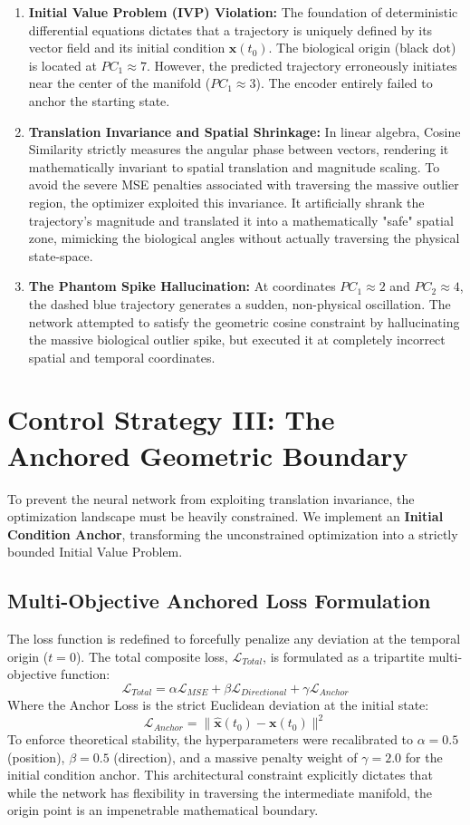 \documentclass[12pt, a4paper]{article}
\begin{document}
	\begin{enumerate}
		\item \textbf{Initial Value Problem (IVP) Violation:} The foundation of deterministic differential equations dictates that a trajectory is uniquely defined by its vector field and its initial condition $\mathbf{x}(t_0)$. The biological origin (black dot) is located at $PC_1 \approx 7$. However, the predicted trajectory erroneously initiates near the center of the manifold ($PC_1 \approx 3$). The encoder entirely failed to anchor the starting state.
		\item \textbf{Translation Invariance and Spatial Shrinkage:} In linear algebra, Cosine Similarity strictly measures the angular phase between vectors, rendering it mathematically invariant to spatial translation and magnitude scaling. To avoid the severe MSE penalties associated with traversing the massive outlier region, the optimizer exploited this invariance. It artificially shrank the trajectory's magnitude and translated it into a mathematically "safe" spatial zone, mimicking the biological angles without actually traversing the physical state-space.
		\item \textbf{The Phantom Spike Hallucination:} At coordinates $PC_1 \approx 2$ and $PC_2 \approx 4$, the dashed blue trajectory generates a sudden, non-physical oscillation. The network attempted to satisfy the geometric cosine constraint by hallucinating the massive biological outlier spike, but executed it at completely incorrect spatial and temporal coordinates.
	\end{enumerate}
	
	\section{Control Strategy III: The Anchored Geometric Boundary}
	
	To prevent the neural network from exploiting translation invariance, the optimization landscape must be heavily constrained. We implement an \textbf{Initial Condition Anchor}, transforming the unconstrained optimization into a strictly bounded Initial Value Problem. 
	
	\subsection{Multi-Objective Anchored Loss Formulation}
	The loss function is redefined to forcefully penalize any deviation at the temporal origin ($t=0$). The total composite loss, $\mathcal{L}_{Total}$, is formulated as a tripartite multi-objective function:
	$$ \mathcal{L}_{Total} = \alpha \mathcal{L}_{MSE} + \beta \mathcal{L}_{Directional} + \gamma \mathcal{L}_{Anchor} $$
	Where the Anchor Loss is the strict Euclidean deviation at the initial state:
	$$ \mathcal{L}_{Anchor} = \| \mathbf{\hat{x}}(t_0) - \mathbf{x}(t_0) \|^2 $$
	To enforce theoretical stability, the hyperparameters were recalibrated to $\alpha = 0.5$ (position), $\beta = 0.5$ (direction), and a massive penalty weight of $\gamma = 2.0$ for the initial condition anchor. This architectural constraint explicitly dictates that while the network has flexibility in traversing the intermediate manifold, the origin point is an impenetrable mathematical boundary.
	
\end{document}
